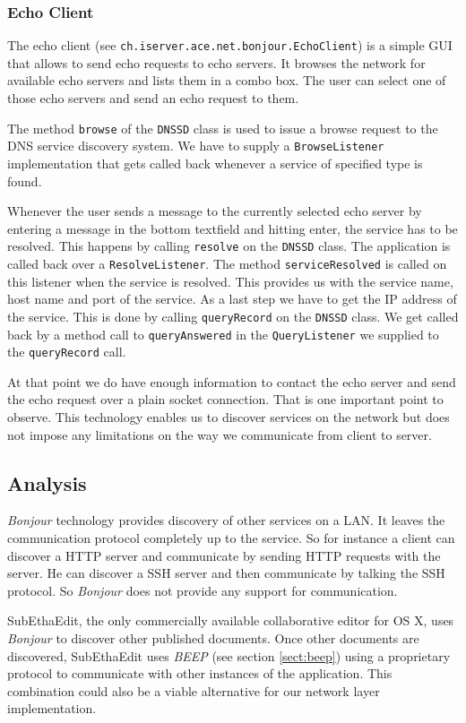 \subsubsection{Echo Client}
The echo client (see \texttt{ch.iserver.ace.net.bonjour.EchoClient}) is a simple GUI that allows to send echo requests to echo servers. It browses the network for available echo servers and lists them in a combo box. The user can select one of those echo servers and send an echo request to them.

The method \texttt{browse} of the \texttt{DNSSD} class is used to issue a browse request to the DNS service discovery system. We have to supply a \texttt{BrowseListener} implementation that gets called back whenever a service of specified type is found.

Whenever the user sends a message to the currently selected echo server by entering a message in the bottom textfield and hitting enter, the service has to be resolved. This happens by calling \texttt{resolve} on the \texttt{DNSSD} class. The application is called back over a \texttt{ResolveListener}. The method \texttt{serviceResolved} is called on this listener when the service is resolved. This provides us with the service name, host name and port of the service. As a last step we have to get the IP address of the service. This is done by calling \texttt{queryRecord} on the \texttt{DNSSD} class. We get called back by a method call to \texttt{queryAnswered} in the \texttt{QueryListener} we supplied to the \texttt{queryRecord} call.

At that point we do have enough information to contact the echo server and send the echo request over a plain socket connection. That is one important point to observe. This technology enables us to discover services on the network but does not impose any limitations on the way we communicate from client to server.


\subsection{Analysis}
\emph{Bonjour} technology provides discovery of other services on a LAN. It leaves the communication protocol completely up to the service. So for instance a client can discover a HTTP server and communicate by sending HTTP requests with the server. He can discover a SSH server and then communicate by talking the SSH protocol. So \emph{Bonjour} does not provide any support for communication.

SubEthaEdit, the only commercially available collaborative editor for OS X, uses \emph{Bonjour} to discover other published documents. Once other documents are discovered, SubEthaEdit uses \emph{BEEP} (see section \ref{sect:beep}) using a proprietary protocol to communicate with other instances of the application. This combination could also be a viable alternative for our network layer implementation.

